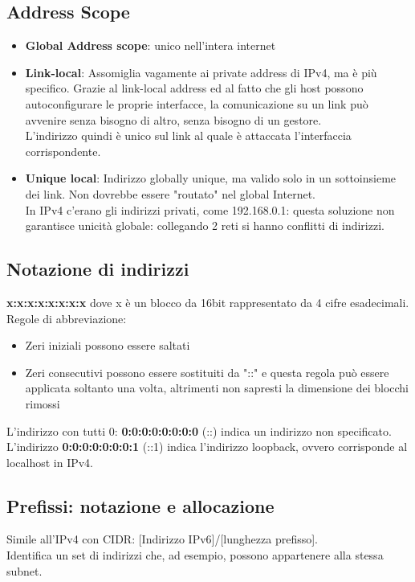 \documentclass{article}
\begin{document}
\subsection{Address Scope}
\begin{itemize}
    \item \textbf{Global Address scope}: unico nell'intera internet
    \item \textbf{Link-local}: Assomiglia vagamente ai private address di IPv4, ma è più specifico. Grazie al link-local address ed al fatto che gli host possono autoconfigurare le proprie interfacce, la comunicazione su un link può avvenire senza bisogno di altro, senza bisogno di un gestore.\\
    L'indirizzo quindi è unico sul link al quale è attaccata l'interfaccia corrispondente. 
    \item \textbf{Unique local}: Indirizzo globally unique, ma valido solo in un sottoinsieme dei link. Non dovrebbe essere "routato" nel global Internet.\\ In IPv4 c'erano gli indirizzi privati, come 192.168.0.1: questa soluzione non garantisce unicità globale: collegando 2 reti si hanno conflitti di indirizzi.
\end{itemize}{}

\subsection{Notazione di indirizzi}
\textbf{x:x:x:x:x:x:x:x} dove x è un blocco da 16bit rappresentato da 4 cifre esadecimali.\\ Regole di abbreviazione:
\begin{itemize}
    \item Zeri iniziali possono essere saltati
    \item Zeri consecutivi possono essere sostituiti da "::" e questa regola può essere applicata soltanto una volta, altrimenti non sapresti la dimensione dei blocchi rimossi
\end{itemize}{}
L'indirizzo con tutti 0: \textbf{0:0:0:0:0:0:0:0} (::) indica un indirizzo non specificato.\\ L'indirizzo \textbf{0:0:0:0:0:0:0:1} (::1) indica l'indirizzo loopback, ovvero corrisponde al localhost in IPv4.

\subsection{Prefissi: notazione e allocazione}
Simile all'IPv4 con CIDR: [Indirizzo IPv6]/[lunghezza prefisso].\\
Identifica un set di indirizzi che, ad esempio, possono appartenere alla stessa subnet.
\end{document}
